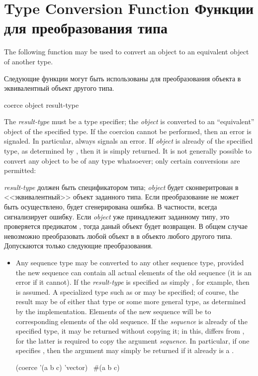 \section{Type Conversion Function Функции для преобразования типа}

The following function may be used to convert an object to an
equivalent object of another type.

Следующие функции могут быть использованы для преобразования объекта в
эквивалентный объект другого типа.

\begin{defun}[Function]
coerce object result-type

The {\it result-type} must be a type specifier; the {\it object} is converted
to an ``equivalent'' object of the specified type.
If the coercion cannot be performed, then an error is signaled.
In particular,  always signals an error.
If {\it object} is already of the specified type, as determined
by , then it is simply returned.
It is not generally
possible to convert any object to be of any type whatsoever; only certain
conversions are permitted:

{\it result-type} должен быть спецификатором типа; {\it object} будет
сконверитрован в <<эквивалентный>> объект заданного типа.
Если преобразование не может быть осуществлено, будет сгенерирована ошибка.
В частности,  всегда сигнализирует ошибку.
Если {\it object} уже принадлежит заданному типу, это проверяется предикатом
, тогда даный объект будет возвращен.
В общем случае невозможно преобразовать любой объект в в объекто любого другого
типа. Допускаются только следующие преобразования.
\begin{itemize}
\item
Any sequence type may be converted to any other sequence type, provided
the new sequence can contain all actual elements of the old sequence
(it is an error if it cannot).  If the {\it result-type} is specified as
simply , for example, then  is assumed.  A
specialized type such as  or 
may be specified; of course, the result may be of either that type or
some more general type, as determined by the implementation.
Elements of the new sequence will be  to corresponding elements
of the old sequence.
If the
{\it sequence} is already of the specified type, it may be returned without
copying it; in this,  differs from
, for the latter is required to
copy the argument {\it sequence}.  In particular, if one specifies
, then the argument may simply be returned if it already is
a .
\begin{lisp}
(coerce '(a b c) 'vector) \EV\ \#(a b c)
\end{lisp}
\end{itemize}


\end{defun}
